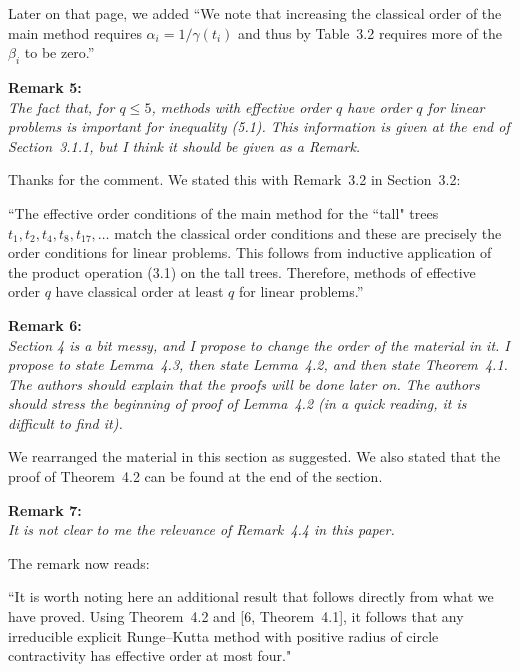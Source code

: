 \documentclass[12pt]{article}
\newcommand{\remark}[2]{\vspace{25pt} \noindent \textbf{Remark #1:\newline} \textit{#2}\vspace{15pt}}
\renewcommand{\newline}{\vspace{15pt}\\}
\newcommand{\david}[1]{\textcolor{red}{\\\textbf{D: \footnotesize #1}\\}}
\begin{document}
Later on that page, we added
``We note that increasing the classical order of the main method requires 
$\alpha_i = 1/\gamma(t_i)$ and
thus by Table~3.2 requires more of the $\beta_i$ to be zero.''

\pagebreak

\remark{5}{
The fact that, for $q \leq 5$, methods with effective order $q$ have order $q$ 
for linear problems is important for inequality (5.1). 
This information is given at the end of Section~3.1.1, but I think it should be given as a Remark.}

Thanks for the comment. We stated this with Remark~3.2 in Section~3.2:

``The effective order conditions of the main method for the ``tall" trees 
$t_1, t_2, t_4, t_8, t_{17}, \dots$ match the classical order conditions
and these are precisely the order conditions for linear problems.
This follows from inductive application of the product operation (3.1)
on the tall trees. 
Therefore, methods of effective order $q$ have classical order at least $q$ 
for linear problems.''


\remark{6}{
Section 4 is a bit messy, and I propose to change the order of the material in it. 
I propose to state Lemma~4.3, then state Lemma~4.2, and then state Theorem~4.1. 
The authors should explain that the proofs will be done later on. 
The authors should stress the beginning of proof of Lemma~4.2 (in a quick reading, 
it is difficult to find it).}

We rearranged the material in this section as suggested.
We also stated that the proof of Theorem~4.2 can be found at the end of the section.


\remark{7}{
It is not clear to me the relevance of Remark~4.4 in this paper.}

The remark now reads:

``It is worth noting here an additional result that 
follows directly from what we have proved.
Using Theorem~4.2 and [6, Theorem~4.1], 
it follows that any irreducible explicit Runge--Kutta method with positive radius of
circle contractivity has effective order at most four."
\end{document}
